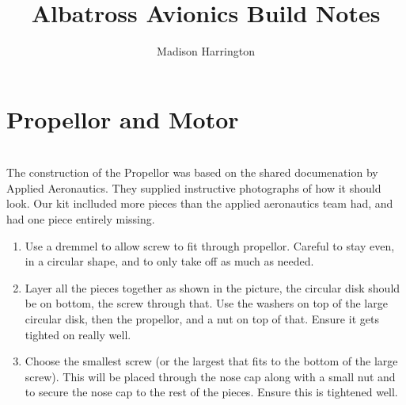 \documentclass{article}
\begin{document}
\title{Albatross Avionics Build Notes}
\author{Madison Harrington}
\maketitle

\section{Propellor and Motor} \\

The construction of the Propellor was based on the shared documenation by Applied Aeronautics. They supplied instructive 
photographs of how it should look. Our kit inclluded more pieces than the applied aeronautics team had, and had one piece entirely missing. 

\begin{enumerate}

\item Use a dremmel to allow screw to fit through propellor. Careful to stay even, in a circular shape, and to only take off as much as needed. 
\item Layer all the pieces together as shown in the picture, the circular disk should be on bottom, the screw through that. Use the washers
on top of the large circular disk, then the propellor, and a nut on top of that. Ensure it gets tighted on really well. 
\item Choose the smallest screw (or the largest that fits to the bottom of the large screw). This will be placed through the nose cap 
along with a small nut and  to secure the nose cap to the rest of the pieces. Ensure this is tightened well.

\end{enumerate}
\end{document}
